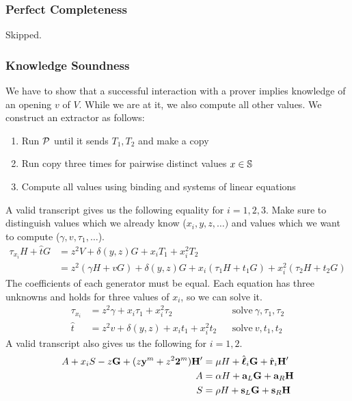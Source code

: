 \subsubsection{Perfect Completeness}

Skipped.

\subsubsection{Knowledge Soundness}

We have to show that a successful interaction with a prover implies knowledge of an opening $v$ of $V$.
While we are at it,
we also compute all other values.
%
We construct an extractor as follows:
%
\begin{enumerate}
    \item Run $\mathcal{P}$ until it sends $T_1, T_2$ and make a copy
    \item Run copy three times for pairwise distinct values $x \in \mathbb{S}$
    \item Compute all values using binding and systems of linear equations
\end{enumerate}
%
A valid transcript gives us the following equality for $i = 1, 2, 3$.
Make sure to distinguish values which we already know ($x_i, y, z, \ldots)$ and values which we want to compute ($\gamma, v, \tau_1, \ldots$).
%
\begin{align*}
    \tau_{x_i} H + \hat{t} G
    &= z^2 V + \delta(y, z)G + x_iT_1 + x_i^2T_2 \\
    &= z^2 (\gamma H + v G) + \delta(y, z)G + x_i (\tau_1 H + t_1 G) + x_i^2 (\tau_2 H + t_2 G)
\end{align*}
%
The coefficients of each generator must be equal.
Each equation has three unknowns and holds for three values of $x_i$,
so we can solve it.
%
\begin{align*}
    \tau_{x_i} &= z^2 \gamma + x_i \tau_1 + x_i^2 \tau_2 &&\text{solve}\ \gamma, \tau_1, \tau_2 \\
    \hat{t} &= z^2 v + \delta(y, z) + x_i t_1 + x_i^2 t_2 &&\text{solve}\ v, t_1, t_2
\end{align*}
%
A valid transcript also gives us the following for $i = 1, 2$.
%
\begin{align*}
    A + x_i S - z\mathbf{G} + (z \mathbf{y}^m + z^2 \mathbf{2}^m)\mathbf{H}' &= \mu H + \hat{\mathbf{\boldsymbol{\ell}}}_i\mathbf{G} + \hat{\mathbf{r}}_i\mathbf{H}' \\
    A &= \alpha H + \mathbf{a}_L\mathbf{G} + \mathbf{a}_R\mathbf{H} \\
    S &= \rho H + \mathbf{s}_L\mathbf{G} + \mathbf{s}_R\mathbf{H}
\end{align*}
